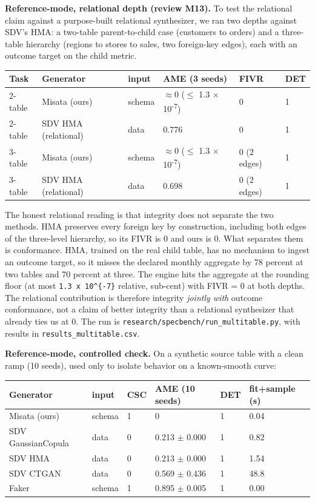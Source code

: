 \textbf{Reference-mode, relational depth (review M13).} To test the
relational claim against a purpose-built relational synthesizer, we ran
two depths against SDV's HMA: a two-table parent-to-child case
(customers to orders) and a three-table hierarchy (regions to stores to
sales, two foreign-key edges), each with an outcome target on the child
metric.

\begin{longtable}[]{@{}llllll@{}}
\toprule
Task & Generator & input & AME (3 seeds) & FIVR & DET\tabularnewline
\midrule
\endhead
2-table & Misata (ours) & schema & \ensuremath{\approx}0
(\ensuremath{\le} 1.3 \ensuremath{\times} 10\textsuperscript{-7}) & 0 &
1\tabularnewline
2-table & SDV HMA (relational) & data & 0.776 & 0 & 1\tabularnewline
3-table & Misata (ours) & schema & \ensuremath{\approx}0
(\ensuremath{\le} 1.3 \ensuremath{\times} 10\textsuperscript{-7}) & 0 (2
edges) & 1\tabularnewline
3-table & SDV HMA (relational) & data & 0.698 & 0 (2 edges) &
1\tabularnewline
\bottomrule
\end{longtable}

The honest relational reading is that integrity does not separate the
two methods. HMA preserves every foreign key by construction, including
both edges of the three-level hierarchy, so its FIVR is 0 and ours is 0.
What separates them is conformance. HMA, trained on the real child
table, has no mechanism to ingest an outcome target, so it misses the
declared monthly aggregate by 78 percent at two tables and 70 percent at
three. The engine hits the aggregate at the rounding floor (at most
\texttt{1.3\ x\ 10\^{}\{-7\}} relative, sub-cent) with FIVR = 0 at both
depths. The relational contribution is therefore integrity \emph{jointly
with} outcome conformance, not a claim of better integrity than a
relational synthesizer that already ties us at 0. The run is
\texttt{research/\allowbreak{}specbench/\allowbreak{}run\_\allowbreak{}multitable.py}, with results in
\texttt{results\_\allowbreak{}multitable.csv}.

\textbf{Reference-mode, controlled check.} On a synthetic source table
with a clean ramp (10 seeds), used only to isolate behavior on a
known-smooth curve:

\begin{longtable}[]{@{}llllll@{}}
\toprule
Generator & input & CSC & AME (10 seeds) & DET & fit+sample
(s)\tabularnewline
\midrule
\endhead
Misata (ours) & schema & 1 & 0 & 1 & 0.04\tabularnewline
SDV GaussianCopula & data & 0 & 0.213 \ensuremath{\pm} 0.000 & 1 &
0.82\tabularnewline
SDV HMA & data & 0 & 0.213 \ensuremath{\pm} 0.000 & 1 &
1.54\tabularnewline
SDV CTGAN & data & 0 & 0.569 \ensuremath{\pm} 0.436 & 1 &
48.8\tabularnewline
Faker & schema & 1 & 0.895 \ensuremath{\pm} 0.005 & 1 &
0.00\tabularnewline
\bottomrule
\end{longtable}

